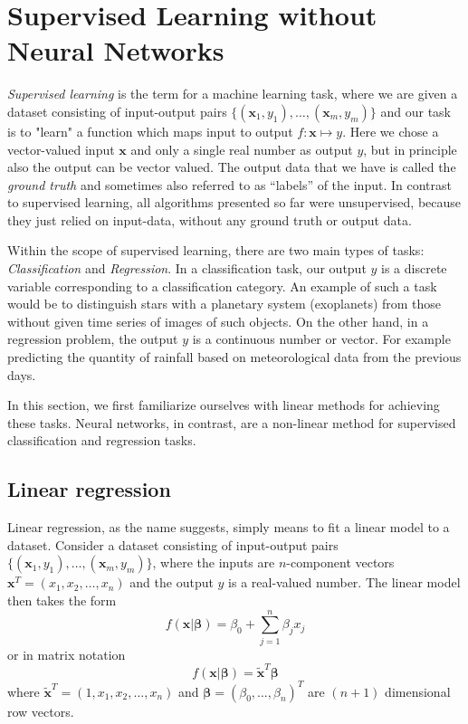 \section{Supervised Learning without Neural Networks}
\label{sec: linear methods for supervised learning}
\textit{Supervised learning} is the term for a machine learning task, where we are given a dataset consisting of input-output pairs $\lbrace(\bm{x}_{1}, y_{1}), \dots, (\bm{x}_{m}, y_{m})\rbrace$ and our task is to "learn" a function which maps input to output $f: \bm{x} \mapsto y$. Here we chose a vector-valued input $\bm{x}$ and only a single real number as output $y$, but in principle also the output can be vector valued. The output data that we have is called the \emph{ground truth} and sometimes also referred to as ``labels'' of the input. In contrast to supervised learning, all algorithms presented so far were unsupervised, because they just relied on input-data, without any ground truth or output data.
 
Within the scope of supervised learning, there are two main types of tasks: \textit{Classification} and \textit{Regression}. In a classification task, our output $y$ is a discrete variable corresponding to a classification category. An example of such a task would be to distinguish stars with a planetary system (exoplanets) from those without given time series of images of such objects. On the other hand, in a regression problem, the output $y$ is a continuous number or vector. For example predicting the quantity of rainfall based on meteorological data from the previous days.

In this section, we first familiarize ourselves with linear methods for achieving these tasks. Neural networks, in contrast, are a non-linear method for supervised classification and regression tasks.

\subsection{Linear regression}\label{sec:linear regression}
Linear regression, as the name suggests, simply means to fit a linear model to a dataset. Consider a dataset consisting of input-output pairs  $\lbrace(\bm{x}_{1}, y_{1}), \dots, (\bm{x}_{m}, y_{m})\rbrace$, where the inputs are $n$-component vectors $\boldsymbol{x}^{T} = (x_1, x_2, \dots , x_n)$ and the output $y$ is a real-valued number. The linear model then takes the form
\begin{equation} \label{eqn: Univariate Linear Model}
     f(\boldsymbol{x}|\bm{\beta}) = \beta_0 + \sum_{j=1}^{n} \beta_{j}x_{j} 
\end{equation}
or in matrix notation
\begin{equation}\label{eqn: Univariate Linear Model Matrix Form}
    f(\boldsymbol{x}|\bm{\beta}) = \tilde{\bm{x}}^{T}\bm{\beta}
\end{equation}
where $\bm{\tilde{x}}^{T} = (1, x_1, x_2, \dots , x_n)$ 
and $\bm{\beta} = (\beta_0, \dots, \beta_n)^{T}$ are $(n+1)$ dimensional row vectors. %

